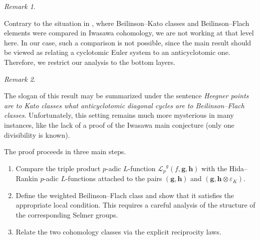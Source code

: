 \documentclass[a4paper,11pt]{amsart}
\theoremstyle{plain}
\newtheorem{theorem}{Theorem}[section]
\theoremstyle{definition}
\theoremstyle{remark}
\newtheorem{remarkwr}[theorem]{Remark}
\newenvironment{remark}{\begin{remarkwr}\begin{upshape}}{\end{upshape}\end{remarkwr}}
\newcommand{\Lp}{{\mathscr{L}_p}}
\newcommand{\hf}{{\mathbf{f}}}
\newcommand{\hg}{{\mathbf{g}}}
\newcommand{\hh}{{\mathbf h}}
\newcommand{\res}{\mathrm{res}}
\numberwithin{equation}{section}
\begin{document}
\begin{remark}
Contrary to the situation in \cite{BDV}, where Beilinson--Kato classes and Beilinson--Flach elements were compared in Iwasawa cohomology, we are not working at that level here. In our case, such a comparison is not possible, since the main result should be viewed as relating a cyclotomic Euler system to an anticyclotomic one. Therefore, we restrict our analysis to the bottom layers.
\end{remark}

\begin{remark}
The slogan of this result may be summarized under the sentence {\it Heegner points are to Kato classes what anticyclotomic diagonal cycles are to Beilinson--Flach classes}. Unfortunately, this setting remains much more mysterious in many instances, like the lack of a proof of the Iwasawa main conjecture (only one divisibility is known).
\end{remark}

The proof proceeds in three main steps.

\begin{enumerate}
\item[(a)] Compare the triple product $p$-adic $L$-function $\Lp^g(f,\hg,\hh)$ with the Hida--Rankin $p$-adic $L$-functions attached to the pairs $(\hg,\hh)$ and $(\hg, \hh \otimes \varepsilon_K)$.
\item[(b)] Define the weighted Beilinson--Flach class and show that it satisfies the appropriate local condition. This requires a careful analysis of the structure of the corresponding Selmer groups.
\item[(c)] Relate the two cohomology classes via the explicit reciprocity laws.
\end{enumerate}
\end{document}
